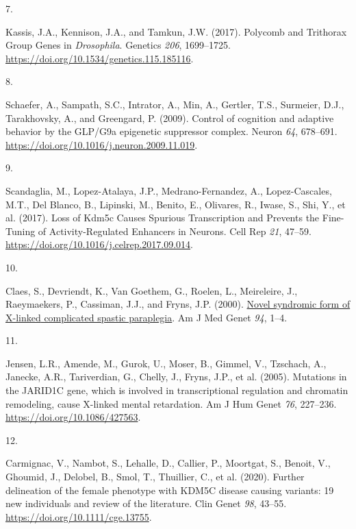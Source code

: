 \documentclass[
]{article}
\newlength{\cslhangindent}
\newlength{\csllabelwidth}
\newlength{\cslentryspacingunit} %
\newenvironment{CSLReferences}[2] %
 {%
  \setlength{\parindent}{0pt}
  \ifodd #1
  \let\oldpar\par
  \def\par{\hangindent=\cslhangindent\oldpar}
  \fi
  \setlength{\parskip}{#2\cslentryspacingunit}
 }%
 {}
\newcommand{\CSLLeftMargin}[1]{\parbox[t]{\csllabelwidth}{#1}}
\newcommand{\CSLRightInline}[1]{\parbox[t]{\linewidth - \csllabelwidth}{#1}\break}
\begin{document}
\begin{CSLReferences}{0}{0}
\leavevmode{}%
\CSLLeftMargin{7. }%
\CSLRightInline{Kassis, J.A., Kennison, J.A., and Tamkun, J.W. (2017).
Polycomb and {Trithorax Group Genes} in {\emph{Drosophila}}. Genetics
\emph{206}, 1699--1725.
\url{https://doi.org/10.1534/genetics.115.185116}.}

\leavevmode{}%
\CSLLeftMargin{8. }%
\CSLRightInline{Schaefer, A., Sampath, S.C., Intrator, A., Min, A.,
Gertler, T.S., Surmeier, D.J., Tarakhovsky, A., and Greengard, P.
(2009). Control of cognition and adaptive behavior by the {GLP}/{G9a}
epigenetic suppressor complex. Neuron \emph{64}, 678--691.
\url{https://doi.org/10.1016/j.neuron.2009.11.019}.}

\leavevmode{}%
\CSLLeftMargin{9. }%
\CSLRightInline{Scandaglia, M., Lopez-Atalaya, J.P., Medrano-Fernandez,
A., Lopez-Cascales, M.T., Del Blanco, B., Lipinski, M., Benito, E.,
Olivares, R., Iwase, S., Shi, Y., et al. (2017). Loss of {Kdm5c Causes
Spurious Transcription} and {Prevents} the {Fine-Tuning} of
{Activity-Regulated Enhancers} in {Neurons}. Cell Rep \emph{21}, 47--59.
\url{https://doi.org/10.1016/j.celrep.2017.09.014}.}

\leavevmode{}%
\CSLLeftMargin{10. }%
\CSLRightInline{Claes, S., Devriendt, K., Van Goethem, G., Roelen, L.,
Meireleire, J., Raeymaekers, P., Cassiman, J.J., and Fryns, J.P. (2000).
\href{https://www.ncbi.nlm.nih.gov/pubmed/10982473}{Novel syndromic form
of {X-linked} complicated spastic paraplegia}. Am J Med Genet \emph{94},
1--4.}

\leavevmode{}%
\CSLLeftMargin{11. }%
\CSLRightInline{Jensen, L.R., Amende, M., Gurok, U., Moser, B., Gimmel,
V., Tzschach, A., Janecke, A.R., Tariverdian, G., Chelly, J., Fryns,
J.P., et al. (2005). Mutations in the {JARID1C} gene, which is involved
in transcriptional regulation and chromatin remodeling, cause {X-linked}
mental retardation. Am J Hum Genet \emph{76}, 227--236.
\url{https://doi.org/10.1086/427563}.}

\leavevmode{}%
\CSLLeftMargin{12. }%
\CSLRightInline{Carmignac, V., Nambot, S., Lehalle, D., Callier, P.,
Moortgat, S., Benoit, V., Ghoumid, J., Delobel, B., Smol, T., Thuillier,
C., et al. (2020). Further delineation of the female phenotype with
{KDM5C} disease causing variants: 19 new individuals and review of the
literature. Clin Genet \emph{98}, 43--55.
\url{https://doi.org/10.1111/cge.13755}.}


\end{CSLReferences}
\end{document}
